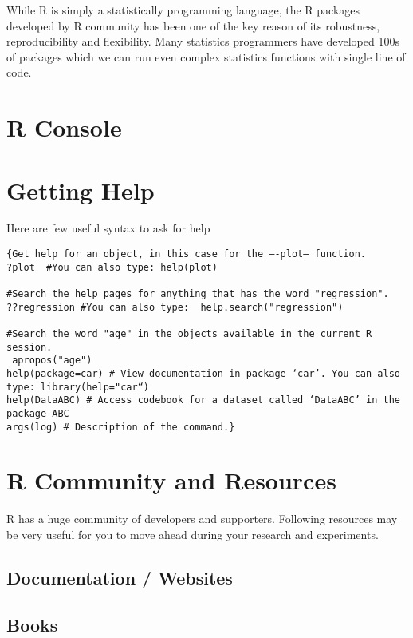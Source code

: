 \documentclass[
]{book}
\begin{document}
While R is simply a statistically programming language, the R packages developed by R community has been one of the key reason of its robustness, reproducibility and flexibility. Many statistics programmers have developed 100s of packages which we can run even complex statistics functions with single line of code.

\hypertarget{r-console}{%
\section{R Console}\label{r-console}}

\hypertarget{getting-help}{%
\section{Getting Help}\label{getting-help}}

Here are few useful syntax to ask for help

\begin{verbatim}
{Get help for an object, in this case for the –-plot– function. 
?plot  #You can also type: help(plot)

#Search the help pages for anything that has the word "regression". 
??regression #You can also type:  help.search("regression")

#Search the word "age" in the objects available in the current R session.
 apropos("age")
help(package=car) # View documentation in package ‘car’. You can also type: library(help="car“)
help(DataABC) # Access codebook for a dataset called ‘DataABC’ in the package ABC
args(log) # Description of the command.}
\end{verbatim}

\hypertarget{r-community-and-resources}{%
\section{R Community and Resources}\label{r-community-and-resources}}

R has a huge community of developers and supporters. Following resources may be very useful for you to move ahead during your research and experiments.

\hypertarget{documentation-websites}{%
\subsection{Documentation / Websites}\label{documentation-websites}}

\hypertarget{books}{%
\subsection{Books}\label{books}}
\end{document}
